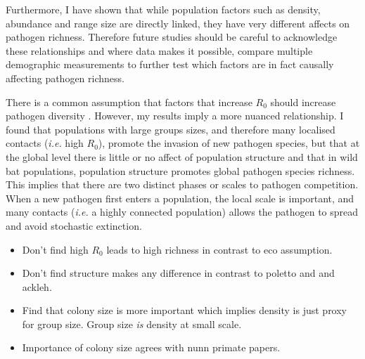 Furthermore, I have shown that while population factors such as density, abundance and range size are directly linked, they have very different affects on pathogen richness.
Therefore future studies should be careful to acknowledge these relationships and where data makes it possible, compare multiple demographic measurements to further test which factors are in fact causally affecting pathogen richness.








There is a common assumption that factors that increase $R_0$ should increase pathogen diversity \cite{nunn2003comparative, morand2000wormy}.
However, my results imply a more nuanced relationship. 
I found that populations with large groups sizes, and therefore many localised contacts (\emph{i.e.} high $R_0$), promote the invasion of new pathogen species, but that at the global level there is little or no affect of population structure and that in wild bat populations, population structure promotes global pathogen species richness.
This implies that there are two distinct phases or scales to pathogen competition.
When a new pathogen first enters a population, the local scale is important, and many contacts (\emph{i.e.} a highly connected population) allows the pathogen to spread and avoid stochastic extinction.

\begin{itemize}
\item Don't find high $R_0$ leads to high richness in contrast to eco assumption.
\item Don't find structure makes any difference in contrast to poletto and \cite{nunes2006localized} and ackleh.
\item Find that colony size is more important which implies density is just proxy for group size. Group size \emph{is} density at small scale.
\item Importance of colony size agrees with nunn primate papers.
\end{itemize}







